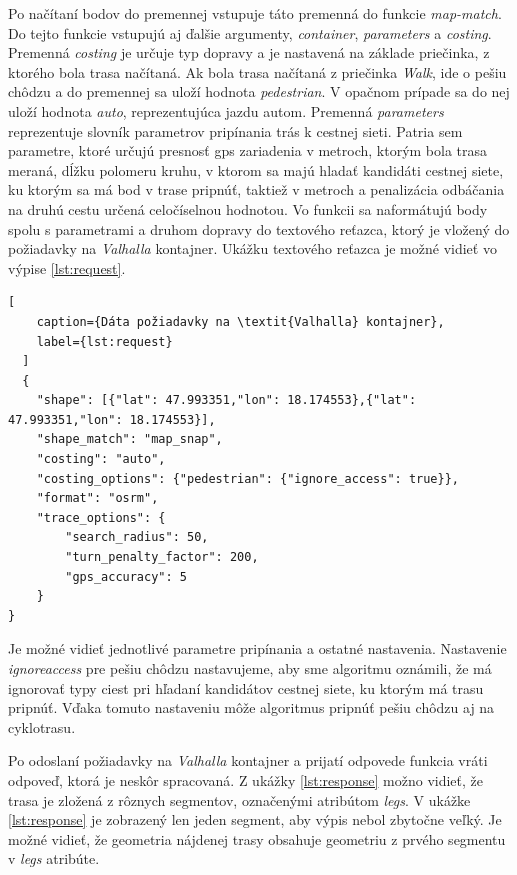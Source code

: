 Po načítaní bodov do premennej vstupuje táto premenná do funkcie \textit{map-match}. Do tejto funkcie vstupujú aj ďalšie argumenty, \textit{container}, \textit{parameters} a \textit{costing}. Premenná \textit{costing} je určuje typ dopravy a je nastavená na základe priečinka, z ktorého bola trasa načítaná. Ak bola trasa načítaná z priečinka \textit{Walk}, ide o pešiu chôdzu a do premennej sa uloží hodnota \textit{pedestrian}. V opačnom prípade sa do nej uloží hodnota \textit{auto}, reprezentujúca jazdu autom. Premenná \textit{parameters} reprezentuje slovník parametrov pripínania trás k cestnej sieti. Patria sem parametre, ktoré určujú presnosť \acrshort{gps} zariadenia v metroch, ktorým bola trasa meraná, dĺžku polomeru kruhu, v ktorom sa majú hladať kandidáti cestnej siete, ku ktorým sa má bod v trase pripnúť, taktiež v metroch a penalizácia odbáčania na druhú cestu určená celočíselnou hodnotou. Vo funkcii sa naformátujú body spolu s parametrami a druhom dopravy do textového reťazca, ktorý je vložený do požiadavky na \textit{Valhalla} kontajner. Ukážku textového reťazca je možné vidieť vo výpise \ref{lst:request}.
\begin{lstlisting}[
    caption={Dáta požiadavky na \textit{Valhalla} kontajner},
    label={lst:request}
  ]
  {
    "shape": [{"lat": 47.993351,"lon": 18.174553},{"lat": 47.993351,"lon": 18.174553}],
    "shape_match": "map_snap",
    "costing": "auto",
    "costing_options": {"pedestrian": {"ignore_access": true}},
    "format": "osrm",
    "trace_options": {
        "search_radius": 50,
        "turn_penalty_factor": 200,
        "gps_accuracy": 5
    }
}
  \end{lstlisting}
Je možné vidieť jednotlivé parametre pripínania a ostatné nastavenia. Nastavenie \textit{ignore\textunderscore access} pre pešiu chôdzu nastavujeme, aby sme algoritmu oznámili, že má ignorovať typy ciest pri hľadaní kandidátov cestnej siete, ku ktorým má trasu pripnúť. Vďaka tomuto nastaveniu môže algoritmus pripnúť pešiu chôdzu aj na cyklotrasu.

Po odoslaní požiadavky na \textit{Valhalla} kontajner a prijatí odpovede funkcia vráti odpoveď, ktorá je neskôr spracovaná. Z ukážky \ref{lst:response} možno vidieť, že trasa je zložená z rôznych segmentov, označenými atribútom \textit{legs}. V ukážke \ref{lst:response} je zobrazený len jeden segment, aby výpis nebol zbytočne veľký. Je možné vidieť, že geometria nájdenej trasy obsahuje geometriu z prvého segmentu v \textit{legs} atribúte.

